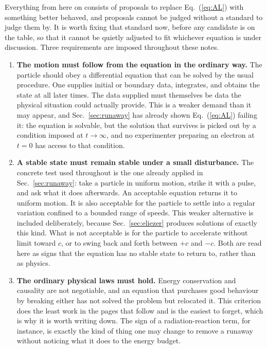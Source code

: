 \documentclass[preprint]{aastex701}
\begin{document}
Everything from here on consists of proposals to replace Eq.~(\ref{eq:AL}) with
something better behaved, and proposals cannot be judged without a standard to
judge them by. It is worth fixing that standard now, before any candidate is on
the table, so that it cannot be quietly adjusted to fit whichever equation is
under discussion. Three requirements are imposed throughout these notes.

\begin{enumerate}

\item \textbf{The motion must follow from the equation in the ordinary way.}
\label{crit:ivp}
The particle should obey a differential equation that can be solved by the usual
procedure. One supplies initial or boundary data, integrates, and obtains the
state at all later times. The data supplied must themselves be data the physical
situation could actually provide. This is a weaker demand than it may appear,
and Sec.~\ref{sec:runaway} has already shown Eq.~(\ref{eq:AL}) failing it: the
equation is solvable, but the solution that survives is picked out by a
condition imposed at $t\to\infty$, and no experimenter preparing an electron at
$t=0$ has access to that condition.

\item \textbf{A stable state must remain stable under a small disturbance.}
\label{crit:stability}
The concrete test used throughout is the one already applied in
Sec.~\ref{sec:runaway}: take a particle in uniform motion, strike it with a
pulse, and ask what it does afterwards. An acceptable equation returns it to
uniform motion. It is also acceptable for the particle to settle into a regular
variation confined to a bounded range of speeds. This weaker alternative is
included deliberately, because Sec.~\ref{sec:eliezer} produces solutions of
exactly this kind. What is not acceptable is for the
particle to accelerate without limit toward $c$, or to swing back and forth
between $+c$ and $-c$. Both are read here as signs that the equation has no
stable state to return to, rather than as physics.

\item \textbf{The ordinary physical laws must hold.}
\label{crit:conservation}
Energy conservation and causality are not negotiable, and an equation that
purchases good behaviour by breaking either has not solved the problem but
relocated it. This criterion does the least work in the pages that follow and is
the easiest to forget, which is why it is worth writing down. The sign of a
radiation-reaction term, for instance, is exactly the kind of thing one may
change to remove a runaway without noticing what it does to the energy budget.

\end{enumerate}
\end{document}
